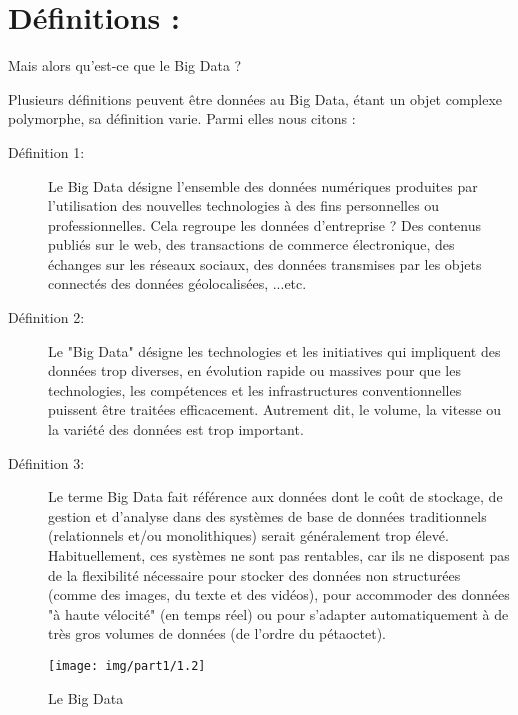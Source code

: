 \section{Définitions : }
\begin{center}
	\color[rgb]{0.2, 0.6, 0.2} Mais alors qu'est-ce que le Big Data ?
\end{center}

Plusieurs définitions peuvent être données au Big Data, étant un objet complexe polymorphe, sa définition varie. Parmi elles nous citons :

\begin{description}

	\item[Définition 1:]Le Big Data désigne l'ensemble des données numériques produites par l'utilisation des nouvelles technologies à des fins personnelles ou professionnelles. Cela regroupe les données d'entreprise ? Des contenus publiés sur le web, des transactions de commerce électronique, des échanges sur les réseaux sociaux, des données transmises par les objets connectés des données géolocalisées, ...etc. \cite{Def1}
	
	\item[Définition 2:]Le "Big Data" désigne les technologies et les initiatives qui impliquent des données trop diverses, en évolution rapide ou massives pour que les technologies, les compétences et les infrastructures conventionnelles puissent être traitées efficacement. Autrement dit, le volume, la vitesse ou la variété des données est trop important. \cite{Def2}
	
	\item[Définition 3:]Le terme Big Data fait référence aux données dont le coût de stockage, de gestion et d'analyse dans des systèmes de base de données traditionnels (relationnels et/ou monolithiques) serait généralement trop élevé. Habituellement, ces systèmes ne sont pas rentables, car ils ne disposent pas de la flexibilité nécessaire pour stocker des données non structurées (comme des images, du texte et des vidéos), pour accommoder des données "à haute vélocité" (en temps réel) ou pour s'adapter automatiquement à de très gros volumes de données (de l'ordre du pétaoctet). \cite{Def3}
	
\end{description}

\begin{figure}[h]
	\centering
	\texttt{[image: img/part1/1.2]}
	\caption{Le Big Data}
\end{figure}